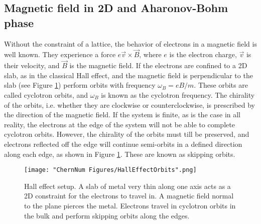 \subsection{Magnetic field in 2D and Aharonov-Bohm phase}
Without the constraint of a lattice, the behavior of electrons in a magnetic field is well known. They experience a force $ e\vec{v}\times\vec{B}$, where $e$ is the electron charge, $\vec{v}$ is their velocity, and $\vec{B}$ is the magnetic field. If the electrons are confined to a 2D slab, as in the classical Hall effect, and the magnetic field is perpendicular to the slab (see Figure \ref{fig:HallEffect}) perform orbits with frequency  $\omega_B = eB/m$. These orbits are called cyclotron orbits, and $\omega_B$ is known as the cyclotron frequency. The chirality of the orbits, i.e. whether they are clockwise or counterclockwise, is prescribed by the direction of the magnetic field. If the system is finite, as is the case in all reality, the electrons at the edge of the system will not be able to complete cyclotron orbits. However, the chirality of the orbits must till be preserved, and electrons reflected off the edge will continue semi-orbits in a defined direction along each edge, as shown in Figure \ref{fig:HallEffect}.  These are known as skipping orbits. 
\begin{figure}
	\texttt{[image: "ChernNum Figures/HallEffectOrbits".png]}
\label{fig:HallEffect}
\caption[Hall effect setup]{Hall effect setup. A slab of metal very thin along one axis acts as a 2D constraint for the electrons to travel in. A magnetic field normal to the plane pierces the metal. Electrons travel in cyclotron orbits in the bulk and perform skipping orbits along the edges.}
\end{figure}

